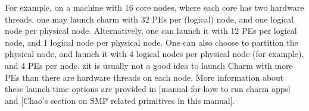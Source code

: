 For example, on a machine with 16 core nodes, where each core has two
hardware threads, one may launch charm with 32 PEs per (logical) node,
and one logical node per physical node. Alternatively, one can launch
it with 12 PEs per logical node, and 1 logical node per physical
node. One can also choose to partition the physical node, and launch
it with 4 logical nodes per physical node (for example), and 4 PEs per
node. zit is usually not a good idea to launch Charm with more PEs
than there are hardware threads on each node. More information about
these launch time options are provided in [manual for how to run charm
apps] and [Chao's section on SMP related primitives in this manual].

 



